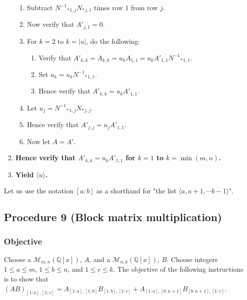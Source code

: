 \documentclass[twocolumn]{article}
\begin{document}
\begin{enumerate}
\begin{enumerate}
						\item Subtract ${{N^{-1}}_*}_{1,j}{N_*}_{j,1}$ times row $1$ from row $j$.
						\item Now verify that $A'_{j,1}=0$.
						\item For $k=2$ to $k=\lvert u\rvert$, do the following:
						\begin{enumerate}
							\item Verify that $A'_{k,k}=A_{k,k}=u_kA_{1,1}=u_kA'_{1,1}{{N^{-1}}_*}_{1,1}$.
							\item Set $u_k=u_k{{N^{-1}}_*}_{1,1}$.
							\item Hence verify that $A'_{k,k}=u_kA'_{1,1}$.
						\end{enumerate}
						\item Let $u_j={{N^{-1}}_*}_{1,j}{N_*}_{j,j}$.
						\item Hence verify that $A'_{j,j}=u_jA'_{1,1}$.
						\item Now let $A=A'$.
					\end{enumerate}
					\item \textbf{Hence verify that $A'_{k,k}=u_kA'_{1,1}$ for $k=1$ to $k=\min(m,n)$.}
					\item \textbf{Yield $\langle u\rangle$.}
				\end{enumerate}
		Let us use the notation $[a:b]$ as a shorthand for "the list $\langle a,a+1,\cdots b-1\rangle$".
		\subsection{Procedure 9 (Block matrix multiplication)}\label{sec:procedure 9}
			\subsubsection{Objective}
				Choose a $\mathcal{M}_{m,n}(\mathbb{Q}[x])$, $A$, and a $\mathcal{M}_{n,k}(\mathbb{Q}[x])$, $B$. Choose integers $1\le a\le m$, $1\le b\le n$, and $1\le c\le k$. The objective of the following instructions is to show that $(AB)_{[1:a],[1:c]}=A_{[1:a],[1:b]}B_{[1:b],[1:c]}+A_{[1:a],[b:n+1]}B_{[b:n+1],[1:c]}$.
\end{document}
